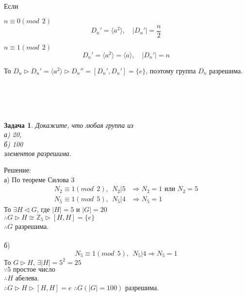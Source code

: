 \documentclass[a4paper,12pt]{article}
\theoremstyle{neosn}
\newtheorem{problem}{Задача}
\begin{document}
Если
\begin{enumerate}
    \begin{item}{$n \equiv 0 (mod \ \ 2)$}
        \[D_n'=\langle a^2 \rangle,\quad |D_n'|=\frac{n}{2}\]            
    \end{item}
    \begin{item}{$n \equiv 1 (mod \ \ 2)$}
        \[D_n'=\langle a^2 \rangle = \langle a \rangle,\quad |D_n'|=n\]
    \end{item}
\end{enumerate}
То $D_n \rhd D_n'=\langle a^2 \rangle \rhd D_n''=[D_n',D_n']=\{e\}$, поэтому группа $D_n$ разрешима.
\\
\\
\\
\\
\\
\begin{problem}
    Докажите, что любая группа из\\
    а) 20,\\
    б) 100 \\
    элементов разрешима.
\end{problem}
Решение:\\
а) По теореме Силова 3\\
\begin{align*}
    N_2 \equiv 1 (mod \ \ 2), \ \ N_2|5 &\Rightarrow N_2 = 1 \text{ или } N_2 = 5 \\
    N_5 \equiv 1(mod \ \ 5),\ \ N_5|4 &\Rightarrow N_5=1
\end{align*}
То $\exists H \lhd G$, где $|H| = 5$ и $|G| = 20$\\
$\therefore G \rhd H \cong \mathbb{Z}_5 \rhd [H,H] = \{e\}$\\
$\therefore G$ разрешима.\\
\\
б)\\
$$
N_5 \equiv 1 (mod \ \ 5),\ \ N_5 | 4 \Rightarrow N_5 = 1
$$
То $G \rhd H$, $\exists |H|=5^2=25$\\
$\because 5 \text{ простое число}$\\
$\therefore H$ абелева.\\
$\therefore G \rhd H \rhd [H,H] = {e}$
$\therefore G(|G|=100)$ разрешима.
\end{document}
